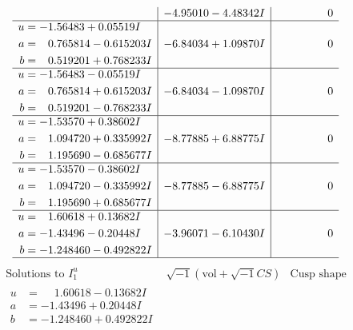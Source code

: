 \documentclass[1p]{elsarticle_modified}
\theoremstyle{definition}
\newcommand{\I}{\sqrt{-1}}
\begin{document}
$$\begin{array}{c|c|c}
 & -4.95010 - 4.48342 I & \phantom{-0.000000 } 0 \\ \hline\begin{aligned}
u &= -1.56483 + 0.05519 I \\
a &= \phantom{-}0.765814 - 0.615203 I \\
b &= \phantom{-}0.519201 + 0.768233 I\end{aligned}
 & -6.84034 + 1.09870 I & \phantom{-0.000000 } 0 \\ \hline\begin{aligned}
u &= -1.56483 - 0.05519 I \\
a &= \phantom{-}0.765814 + 0.615203 I \\
b &= \phantom{-}0.519201 - 0.768233 I\end{aligned}
 & -6.84034 - 1.09870 I & \phantom{-0.000000 } 0 \\ \hline\begin{aligned}
u &= -1.53570 + 0.38602 I \\
a &= \phantom{-}1.094720 + 0.335992 I \\
b &= \phantom{-}1.195690 - 0.685677 I\end{aligned}
 & -8.77885 + 6.88775 I & \phantom{-0.000000 } 0 \\ \hline\begin{aligned}
u &= -1.53570 - 0.38602 I \\
a &= \phantom{-}1.094720 - 0.335992 I \\
b &= \phantom{-}1.195690 + 0.685677 I\end{aligned}
 & -8.77885 - 6.88775 I & \phantom{-0.000000 } 0 \\ \hline\begin{aligned}
u &= \phantom{-}1.60618 + 0.13682 I \\
a &= -1.43496 - 0.20448 I \\
b &= -1.248460 - 0.492822 I\end{aligned}
 & -3.96071 - 6.10430 I & \phantom{-0.000000 } 0\\
 \hline 
 \end{array}$$\newpage$$\begin{array}{c|c|c}  
\text{Solutions to }I^u_{1}& \I (\text{vol} + \sqrt{-1}CS) & \text{Cusp shape}\\
 \hline 
\begin{aligned}
u &= \phantom{-}1.60618 - 0.13682 I \\
a &= -1.43496 + 0.20448 I \\
b &= -1.248460 + 0.492822 I\end{aligned}

\end{array}$$
\end{document}
